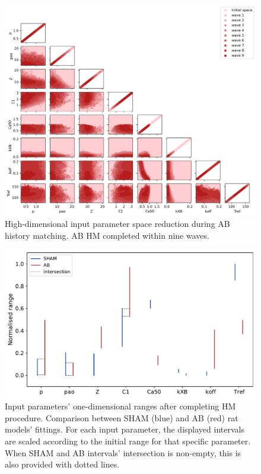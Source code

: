 \begin{figure}[!ht]
    \myfloatalign
    \includegraphics[width=\textwidth]{figures/chapter04/hm_ab.png}
    \caption{High-dimensional input parameter space reduction during AB history matching. AB HM completed within nine waves.}
\end{figure}

\begin{figure}[!ht]
    \myfloatalign
    \includegraphics[width=\textwidth]{figures/chapter04/sham_vs_ab_final_ranges.pdf}
    \caption{Input parameters’ one-dimensional ranges after completing HM procedure. Comparison between SHAM (blue) and AB (red) rat models’ fittings. For each input parameter, the displayed intervals are scaled according to the initial range for that specific parameter. When SHAM and AB intervals’ intersection is non-empty, this is also provided with dotted lines.}
\end{figure}

